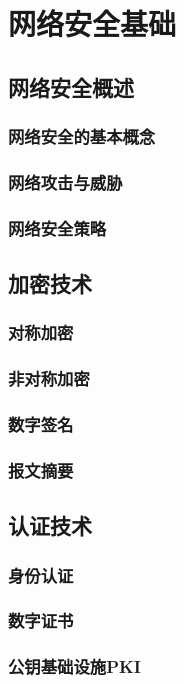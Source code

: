 \documentclass[lang=cn,newtx,10pt,scheme=chinese]{../../elegantbook}
\begin{document}
\chapter{网络安全基础}

\section{网络安全概述}
\subsection{网络安全的基本概念}
\subsection{网络攻击与威胁}
\subsection{网络安全策略}

\section{加密技术}
\subsection{对称加密}
\subsection{非对称加密}
\subsection{数字签名}
\subsection{报文摘要}

\section{认证技术}
\subsection{身份认证}
\subsection{数字证书}
\subsection{公钥基础设施PKI}
\end{document}
